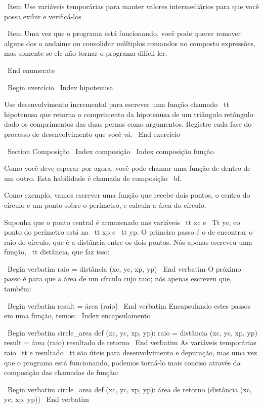 \documentclass[10pt]{book}
\begin{document}
\begin {itemize}
{{{{\ Item Use variáveis ​​temporárias para manter valores intermediários para que você possa
exibir e verificá-los.

\ Item Uma vez que o programa está funcionando, você pode querer remover alguns dos
o andaime ou consolidar múltiplos comandos no composto
expressões, mas somente se ele não tornar o programa difícil
ler.

\ End {enumerate}

\ Begin {} exercício
\ Index {hipotenusa}

Use desenvolvimento incremental para escrever uma função
chamado {\ tt hipotenusa} que retorna o comprimento da hipotenusa de um
triângulo retângulo dado os comprimentos das duas pernas como argumentos.
Registre cada fase do processo de desenvolvimento que você vá.
\ End {} exercício


\ Section {Composição}
\ Index {composição}
\ Index {composição função}

Como você deve esperar por agora, você pode chamar uma função de
dentro de um outro. Esta habilidade é chamada de composição {\ bf}.

Como exemplo, vamos escrever uma função que recebe dois pontos,
o centro do círculo e um ponto sobre o perímetro, e calcula
a área do círculo.

Suponha que o ponto central é armazenado nas variáveis ​​{\ tt xc} e
{\ Tt yc}, eo ponto do perímetro está na {\ tt xp} e {\ tt yp}. O
primeiro passo é o de encontrar o raio do círculo, que é a distância
entre os dois pontos. Nós apenas escreveu uma função, {\ tt
distância}, que faz isso:

\ Begin {verbatim}
raio = distância (xc, yc, xp, yp)
\ End {verbatim}
%
O próximo passo é para que a área de um círculo cujo raio;
nós apenas escreveu que, também:

\ Begin {verbatim}
result = área (raio)
\ End {verbatim}
%
Encapsulando estes passos em uma função, temos:
\ Index {} encapsulamento

\ Begin {verbatim}
circle_area def (xc, yc, xp, yp):
    raio = distância (xc, yc, xp, yp)
    result = área (raio)
    resultado de retorno
\ End {verbatim}
%
As variáveis ​​temporárias raio {\ tt} e {resultado \ tt} são úteis para
desenvolvimento e depuração, mas uma vez que o programa está funcionando, podemos
torná-lo mais conciso através da composição das chamadas de função:

\ Begin {verbatim}
circle_area def (xc, yc, xp, yp):
    área de retorno (distância (xc, yc, xp, yp))
\ End {verbatim}
%

}}}}
\end{itemize}
\end{document}
